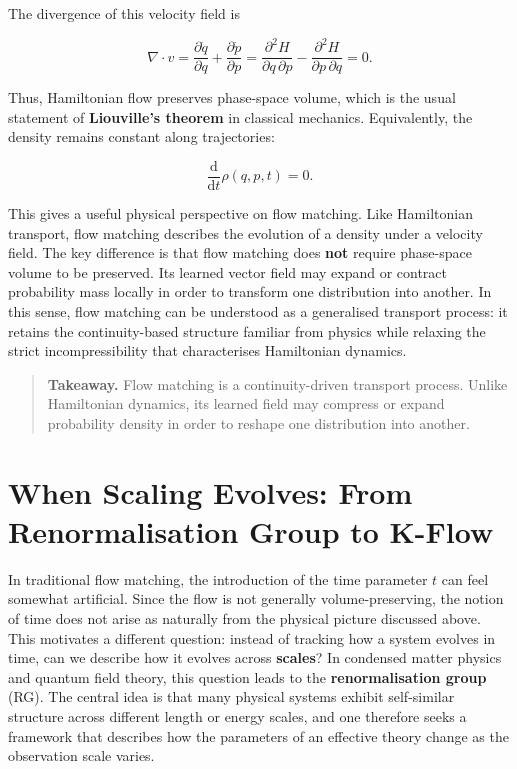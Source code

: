 The divergence of this velocity field is

\[
\nabla \cdot v
= \frac{\partial \dot q}{\partial q} + \frac{\partial \dot p}{\partial p}
= \frac{\partial^2 H}{\partial q\, \partial p} - \frac{\partial^2 H}{\partial p\, \partial q}
= 0.
\]

Thus, Hamiltonian flow preserves phase-space volume, which is the usual statement of \textbf{Liouville's theorem} in classical mechanics. Equivalently, the density remains constant along trajectories:

\[
\frac{\mathrm{d}}{\mathrm{d}t}\rho(q, p, t) = 0.
\]

This gives a useful physical perspective on flow matching. Like Hamiltonian transport, flow matching describes the evolution of a density under a velocity field. The key difference is that flow matching does \textbf{not} require phase-space volume to be preserved. Its learned vector field may expand or contract probability mass locally in order to transform one distribution into another. In this sense, flow matching can be understood as a generalised transport process: it retains the continuity-based structure familiar from physics while relaxing the strict incompressibility that characterises Hamiltonian dynamics.

\begin{quote}
\textbf{Takeaway.} Flow matching is a continuity-driven transport process. Unlike Hamiltonian dynamics, its learned field may compress or expand probability density in order to reshape one distribution into another.
\end{quote}

\section{When Scaling Evolves: From Renormalisation Group to K-Flow}

In traditional flow matching, the introduction of the time parameter \(t\) can feel somewhat artificial. Since the flow is not generally volume-preserving, the notion of time does not arise as naturally from the physical picture discussed above. This motivates a different question: instead of tracking how a system evolves in time, can we describe how it evolves across \textbf{scales}? In condensed matter physics and quantum field theory, this question leads to the \textbf{renormalisation group} (RG). The central idea is that many physical systems exhibit self-similar structure across different length or energy scales, and one therefore seeks a framework that describes how the parameters of an effective theory change as the observation scale varies.


